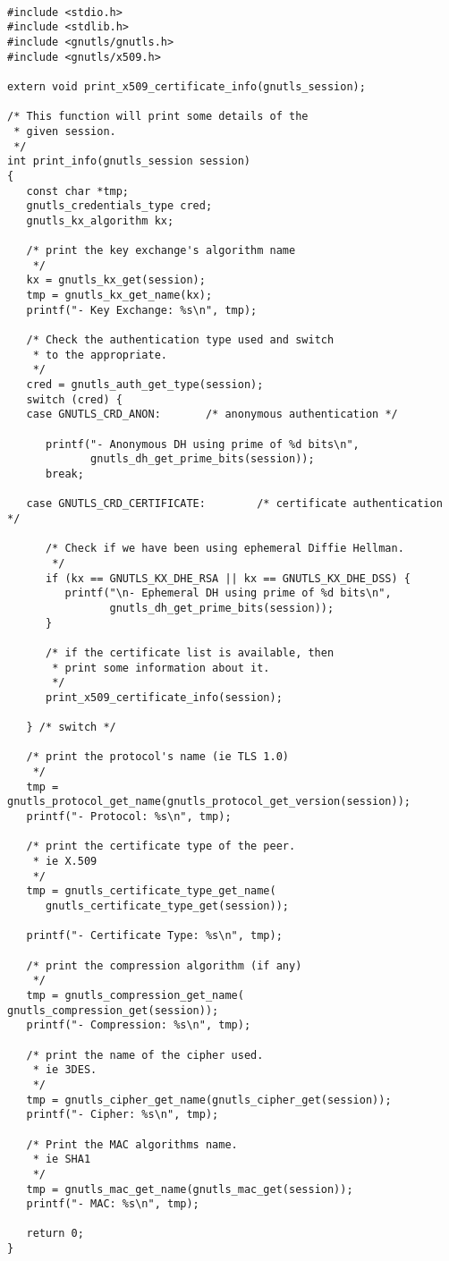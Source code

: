 \begin{verbatim}

#include <stdio.h>
#include <stdlib.h>
#include <gnutls/gnutls.h>
#include <gnutls/x509.h>

extern void print_x509_certificate_info(gnutls_session);

/* This function will print some details of the
 * given session.
 */
int print_info(gnutls_session session)
{
   const char *tmp;
   gnutls_credentials_type cred;
   gnutls_kx_algorithm kx;

   /* print the key exchange's algorithm name
    */
   kx = gnutls_kx_get(session);
   tmp = gnutls_kx_get_name(kx);
   printf("- Key Exchange: %s\n", tmp);

   /* Check the authentication type used and switch
    * to the appropriate.
    */
   cred = gnutls_auth_get_type(session);
   switch (cred) {
   case GNUTLS_CRD_ANON:       /* anonymous authentication */

      printf("- Anonymous DH using prime of %d bits\n",
             gnutls_dh_get_prime_bits(session));
      break;

   case GNUTLS_CRD_CERTIFICATE:        /* certificate authentication */
      
      /* Check if we have been using ephemeral Diffie Hellman.
       */
      if (kx == GNUTLS_KX_DHE_RSA || kx == GNUTLS_KX_DHE_DSS) {
         printf("\n- Ephemeral DH using prime of %d bits\n",
                gnutls_dh_get_prime_bits(session));
      }

      /* if the certificate list is available, then
       * print some information about it.
       */
      print_x509_certificate_info(session);

   } /* switch */

   /* print the protocol's name (ie TLS 1.0) 
    */
   tmp = gnutls_protocol_get_name(gnutls_protocol_get_version(session));
   printf("- Protocol: %s\n", tmp);

   /* print the certificate type of the peer.
    * ie X.509
    */
   tmp = gnutls_certificate_type_get_name(
      gnutls_certificate_type_get(session));

   printf("- Certificate Type: %s\n", tmp);

   /* print the compression algorithm (if any)
    */
   tmp = gnutls_compression_get_name( gnutls_compression_get(session));
   printf("- Compression: %s\n", tmp);

   /* print the name of the cipher used.
    * ie 3DES.
    */
   tmp = gnutls_cipher_get_name(gnutls_cipher_get(session));
   printf("- Cipher: %s\n", tmp);

   /* Print the MAC algorithms name.
    * ie SHA1
    */
   tmp = gnutls_mac_get_name(gnutls_mac_get(session));
   printf("- MAC: %s\n", tmp);

   return 0;
}

\end{verbatim}
